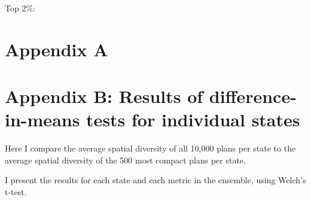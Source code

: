 \documentclass[]{article}
\begin{document}
Top 2\%:

\hypertarget{appendix-a}{%
\section{Appendix A}\label{appendix-a}}

\hypertarget{appendix-b-results-of-difference-in-means-tests-for-individual-states}{%
\section{Appendix B: Results of difference-in-means tests for individual
states}\label{appendix-b-results-of-difference-in-means-tests-for-individual-states}}

Here I compare the average spatial diversity of all 10,000 plans per
state to the average spatial diversity of the 500 most compact plans per
state.

I present the results for each state and each metric in the ensemble,
using Welch's t-test.
\end{document}
